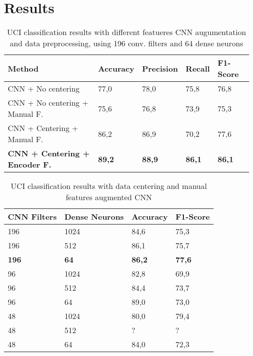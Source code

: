 
\section{Results}
\label{sec:results}

\begin{table*}[t]
	\begin{center}
		\begin{tabular}{ p{7cm}p{2cm}p{2cm}p{2cm}p{2cm} } 
			\hline
			Method & Accuracy & Precision & Recall & F1-Score \\ 
			\hline
			CNN + No centering & 77,0 & 78,0 & 75,8 & 76,8 \\ 
			CNN + No centering + Manual F. & 75,6 & 76,8 & 73,9 & 75,3 \\
			CNN + Centering + Manual F. & 86,2 & 86,9 & 70,2 & 77,6 \\ 
			\textbf{CNN + Centering + Encoder F.} & \textbf{89,2} & \textbf{88,9} &  \textbf{86,1} & \textbf{86,1} \\ 
			\hline
		\end{tabular}
	\caption{\label{tab:model-performance} UCI classification results with different featueres CNN augumentation and data preprocessing, using 196 conv. filters and 64 dense neurons}
	\end{center}
\end{table*}

\begin{table}
	\begin{center}
		\begin{tabular}{ p{1.8cm}p{1.7cm}p{1.7cm}p{1.7cm} } 
			\hline
			CNN Filters & Dense Neurons & Accuracy & F1-Score \\ 
			\hline
			196 & 1024 & 84,6 & 75,3 \\
			196 & 512 & 86,1 & 75,7 \\ 
			\textbf{196} & \textbf{64} & \textbf{86,2} & \textbf{77,6} \\ 
			96 & 1024 & 82,8 & 69,9 \\
			96 & 512 & 84,4 & 73,7 \\ 
			96 & 64 & 89,0 & 73,0 \\  
			48 & 1024 & 80,0 & 79,4 \\
			48 & 512 & ? & ? \\ 
			48 & 64 & 84,0 & 72,3 \\
			\hline
		\end{tabular}
	\caption{\label{tab:model-selection} UCI classification results with data centering and manual features augmented CNN}
	\end{center}
\end{table}


